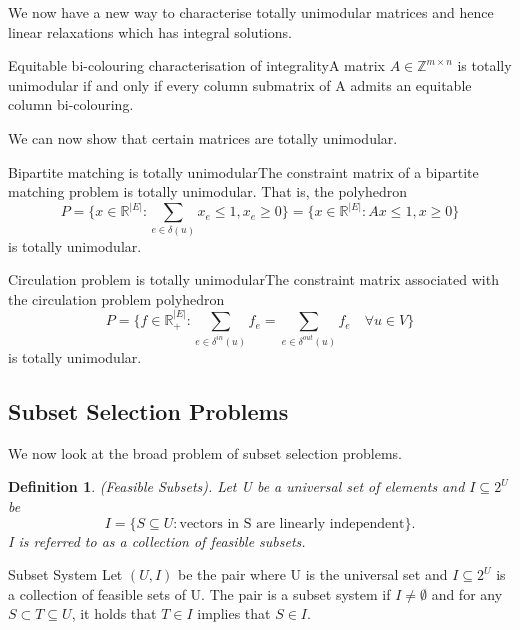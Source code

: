 \documentclass[twoside]{article}
\newtheorem{definition}[theorem]{Definition}
\begin{document}
We now have a new way to characterise totally unimodular matrices and hence linear relaxations which has integral solutions.

\begin{theorem_exam}{Equitable bi-colouring characterisation of integrality}{}A matrix $A \in \mathbb{Z}^{m \times n}$ is totally unimodular if and only if every column submatrix of A admits an equitable column bi-colouring.
\end{theorem_exam}

We can now show that certain matrices are totally unimodular.

\begin{theorem_exam}{Bipartite matching is totally unimodular}{}The constraint matrix of a bipartite matching problem is totally unimodular. That is, the polyhedron 
$$
P = \{x \in \mathbb{R}^{|E|}: \sum_{e \in \delta(u)}x_e \leq 1, x_e \geq 0\} = \{x \in \mathbb{R}^{|E|}: Ax \leq 1, x \geq 0\}
$$
is totally unimodular.
\end{theorem_exam}

\begin{theorem_exam}{Circulation problem is totally unimodular}{}The constraint matrix associated with the circulation problem polyhedron 
$$
P = \{f \in \mathbb{R}_{+}^{|E|}: \sum_{e \in \delta^{in}(u)}f_e=\sum_{e \in \delta^{out}(u)}f_e \quad \forall u \in V\}
$$
is totally unimodular.
\end{theorem_exam}

\subsection{Subset Selection Problems}
We now look at the broad problem of subset selection problems.

\begin{definition}(Feasible Subsets). Let U be a universal set of elements and $I \subseteq 2^U$ be 
$$
I = \{S \subseteq U: \text{vectors in S are linearly independent}\}.
$$
I is referred to as a collection of feasible subsets.
\end{definition}

\begin{definition_exam}{Subset System}{} Let $(U, I)$ be the pair where U is the universal set and $I \subseteq 2^U$ is a collection of feasible sets of U. The pair is a subset system if $I \neq \emptyset$ and for any $S \subset T \subseteq U$, it holds that $T \in I$ implies that $S \in I.$
\end{definition_exam}
\end{document}
